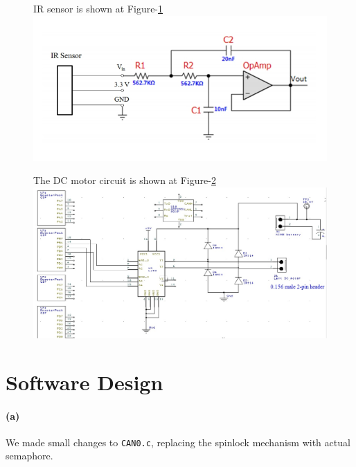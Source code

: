 \documentclass[a4paper]{article}
\newlength{\pic}
\begin{document}
\setlength{\pic}{0.8\textwidth}
\begin{figure}[htp]
\noindent IR sensor is shown at Figure-\ref{ir}
\center
\includegraphics[width=\pic]{circuits/IR_Circuit}
\caption{ }
\label{ir}
\end{figure}



\setlength{\pic}{0.8\textwidth}
\begin{figure}[htp]
\noindent The DC motor circuit is shown at Figure-\ref{motor}
\center
\includegraphics[width=\pic]{circuits/PWM_Circuit}
\caption{ }
\label{motor}
\end{figure}

\section{Software Design} 

\paragraph{(a)} We made small changes to \texttt{CAN0.c}, replacing the spinlock  mechanism with actual semaphore.

\lstset{language=C, style=MyCStyle}

\end{document}
